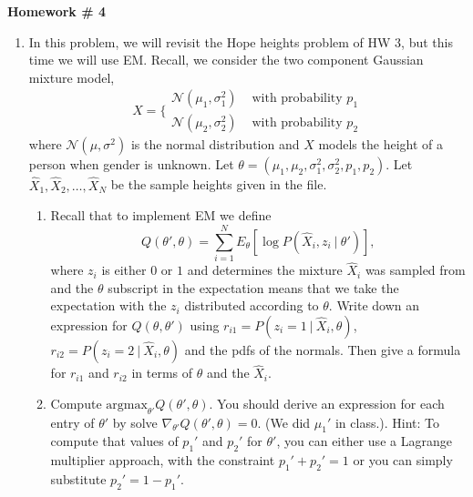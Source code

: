 \documentclass{article}
\begin{document}
\renewcommand{\a}{\textbf{a}}
\renewcommand{\b}{\textbf{b}}
\renewcommand{\d}{\textbf{d}}
\newcommand{\e}{\textbf{e}}

\large

\begin{center}
\textbf{Homework \# 4} \\  
\end{center}

\medskip


\medskip




\begin{enumerate} 


\item In this problem, we will revisit the Hope heights problem of HW $3$, but this time we will use EM.  Recall, we consider the two component Gaussian mixture model,
\begin{equation}
X = \bigg\{
\begin{array}{cc}
\mathcal{N}(\mu_1, \sigma_1^2) & \text{ with probability } p_1 \\
\mathcal{N}(\mu_2, \sigma_2^2) & \text{ with probability } p_2
\end{array}
\end{equation}
where $\mathcal{N}(\mu, \sigma^2)$ is the normal distribution and $X$ models the height of a person when gender is unknown.  Let $\theta = (\mu_1, \mu_2, \sigma_1^2, \sigma_2^2, p_1, p_2)$.   Let $\hat{X}_1, \hat{X}_2,\dots, \hat{X}_N$ be the sample heights given in the file.  
\begin{enumerate}
\item Recall that to implement EM we define 
\begin{equation}
Q(\theta', \theta) = \sum_{i=1}^N E_\theta[\log P(\hat{X}_i, z_i \ | \ \theta')],
\end{equation}
where $z_i$ is either $0$ or $1$ and determines the mixture $\hat{X}_i$ was sampled from and the $\theta$ subscript in the expectation means that we take the expectation with the $z_i$ distributed according to $\theta$.  Write down an expression for $Q(\theta, \theta')$ using $r_{i1} = P(z_i=1 \ | \ \hat{X}_i, \theta)$, $r_{i2} = P(z_i = 2 \ | \ \hat{X}_i, \theta)$ and the pdfs of the normals.  Then give a formula for $r_{i1}$ and $r_{i2}$ in terms of $\theta$ and the $\hat{X}_i$.
\item Compute $\text{argmax}_{\theta'} Q(\theta', \theta)$.   You should derive an expression for each entry of $\theta'$ by solve $\nabla_{\theta'} Q(\theta',\theta) = 0$.  (We did $\mu_1'$ in class.).   Hint:  To compute that values of $p_1'$ and $p_2'$ for $\theta'$, you can either use a Lagrange multiplier approach, with the constraint $p_1' + p_2' = 1$ or you can simply substitute $p_2' = 1 - p_1'$.

\end{enumerate}
\end{enumerate}
\end{document}
